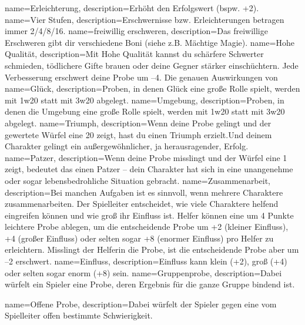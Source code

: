 {
    name={Erleichterung},
    description={Erhöht den Erfolgswert (bspw. +2).}}
{
    name={Vier Stufen},
    description={Erschwernisse bzw. Erleichterungen betragen immer 2/4/8/16.}}
{
    name={freiwillig erschweren},
    description={Das freiwillige Erschweren gibt dir verschiedene Boni (siehe z.B. Mächtige Magie).}}
{
    name={Hohe Qualität},
    description={Mit Hohe Qualität kannst du schärfere Schwerter schmieden, tödlichere Gifte brauen oder deine Gegner stärker einschüchtern. Jede Verbesserung erschwert deine Probe um –4. Die genauen Auswirkungen von}}
{
    name={Glück},
    description={Proben, in denen Glück eine große Rolle spielt, werden mit 1w20 statt mit 3w20 abgelegt.}}
{
    name={Umgebung},
    description={Proben, in denen die Umgebung eine große Rolle spielt, werden mit 1w20 statt mit 3w20 abgelegt.}}
{
    name={Triumph},
    description={Wenn deine Probe gelingt und der gewertete Würfel eine 20 zeigt, hast du einen Triumph erzielt.Und deinem Charakter gelingt ein außergewöhnlicher, ja herausragender, Erfolg.}}
{
    name={Patzer},
    description={Wenn deine Probe misslingt und der Würfel eine 1 zeigt, bedeutet das einen Patzer – dein Charakter hat sich in eine unangenehme oder sogar lebensbedrohliche Situation gebracht.}}
{
    name={Zusammenarbeit},
    description={Bei manchen Aufgaben ist es sinnvoll, wenn mehrere Charaktere zusammenarbeiten. Der Spielleiter entscheidet,
wie viele Charaktere helfend eingreifen können und wie groß ihr Einfluss ist. Helfer können eine um 4 Punkte leichtere Probe ablegen, um die entscheidende Probe um +2 (kleiner Einfluss), +4 (großer Einfluss) oder selten sogar +8 (enormer Einfluss) pro Helfer zu erleichtern. Misslingt der Helferin die Probe, ist die entscheidende Probe aber um –2 erschwert.}}
{
    name={Einfluss},
    description={Einfluss kann klein (+2), groß (+4) oder selten sogar enorm (+8) sein.}}
{
    name={Gruppenprobe},
    description={Dabei würfelt ein Spieler eine Probe, deren Ergebnis für die ganze Gruppe bindend ist.}}

{
    name={Offene Probe},
    description={Dabei würfelt der Spieler gegen eine vom Spielleiter offen bestimmte Schwierigkeit.}}

